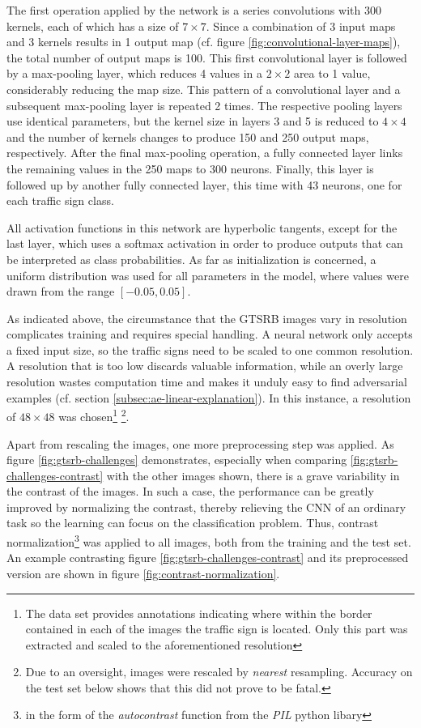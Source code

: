 \documentclass[11pt, a4paper]{article}
\newcommand\brackets[1]{\left[#1\right]}
\begin{document}
The first operation applied by the network is a series convolutions with 300 kernels, each of which has a size of $7 \times 7$. Since a combination of 3 input maps and 3 kernels results in 1 output map (cf. figure \ref{fig:convolutional-layer-maps}), the total number of output maps is 100. This first convolutional layer is followed by a max-pooling layer, which reduces 4 values in a $2 \times 2$ area to 1 value, considerably reducing the map size. This pattern of a convolutional layer and a subsequent max-pooling layer is repeated 2 times. The respective pooling layers use identical parameters, but the kernel size in layers 3 and 5 is reduced to $ 4 \times 4$ and the number of kernels changes to produce 150 and 250 output maps, respectively. After the final max-pooling operation, a fully connected layer links the remaining values in the 250 maps to 300 neurons. Finally, this layer is followed up by another fully connected layer, this time with 43 neurons, one for each traffic sign class.

All activation functions in this network are hyperbolic tangents, except for the last layer, which uses a softmax activation in order to produce outputs that can be interpreted as class probabilities. As far as initialization is concerned, a uniform distribution was used for all parameters in the model, where values were drawn from the range $\brackets{-0.05, 0.05}$.

As indicated above, the circumstance that the GTSRB images vary in resolution complicates training and requires special handling. A neural network only accepts a fixed input size, so the traffic signs need to be scaled to one common resolution. A resolution that is too low discards valuable information, while an overly large resolution wastes computation time and makes it unduly easy to find adversarial examples (cf. section \ref{subsec:ae-linear-explanation}). In this instance, a resolution of $48 \times 48$ was chosen\footnote{The data set provides annotations indicating where within the border contained in each of the images the traffic sign is located. Only this part was extracted and scaled to the aforementioned resolution} \footnote{Due to an oversight, images were rescaled by \emph{nearest} resampling. Accuracy on the test set below shows that this did not prove to be fatal.}.

Apart from rescaling the images, one more preprocessing step was applied. As figure \ref{fig:gtsrb-challenges} demonstrates, especially when comparing \ref{fig:gtsrb-challenges-contrast} with the other images shown, there is a grave variability in the contrast of the images. In such a case, the performance can be greatly improved by normalizing the contrast, thereby relieving the CNN of an ordinary task so the learning can focus on the classification problem. Thus, contrast normalization\footnote{in the form of the \emph{autocontrast} function from the \emph{PIL} python libary} was applied to all images, both from the training and the test set. An example contrasting figure \ref{fig:gtsrb-challenges-contrast} and its preprocessed version are shown in figure \ref{fig:contrast-normalization}.
\end{document}
